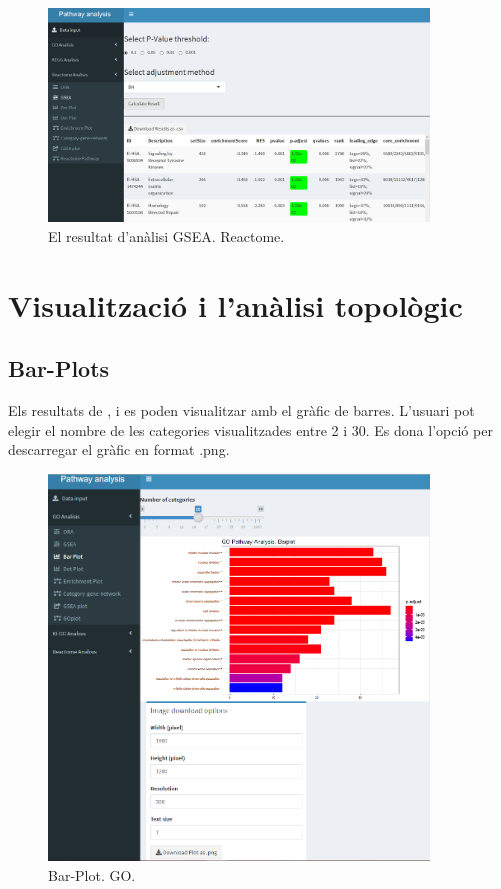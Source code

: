 \begin{figure}[H]
\centering
\includegraphics[width=0.9\textwidth]{figures/App_F13_Items_RA_GSEA.png} 
\caption{El resultat d'anàlisi GSEA. Reactome.}
\end{figure}

\section{Visualització i l'anàlisi topològic}

\subsection{Bar-Plots}
Els resultats de ,  i  es poden visualitzar amb el gràfic de barres. L'usuari pot elegir el nombre de les categories visualitzades entre 2 i 30. Es dona l'opció per descarregar el gràfic en format .png.

\begin{figure}[H]
\centering
\includegraphics[width=0.9\textwidth]{figures/App_F14_Items_GO_BarPlot.png} 
\caption{Bar-Plot. GO.}
\end{figure}

